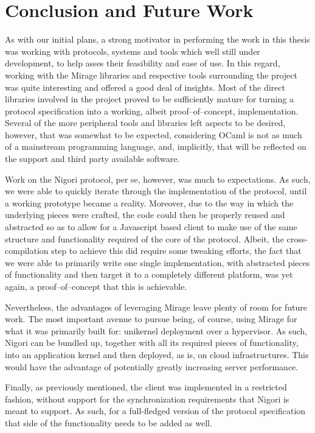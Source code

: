 \chapter{Conclusion and Future Work} \label{chapter:conclusion}
As with our initial plans, a strong motivator in performing the work in this thesis was working with protocols, systems and tools which well still under development, to help asses their feasibility and ease of use.
In this regard, working with the Mirage libraries and respective tools surrounding the project was quite interesting and offered a good deal of insights.
Most of the direct libraries involved in the project proved to be sufficiently mature for turning a protocol specification into a working, albeit proof--of--concept, implementation.
Several of the more peripheral tools and libraries left aspects to be desired, however, that was somewhat to be expected, considering OCaml is not as much of a mainstream programming language, and, implicitly, that will be reflected on the support and third party available software.

Work on the Nigori protocol, per se, however, was much to expectations.
As such, we were able to quickly iterate through the implementation of the protocol, until a working prototype became a reality.
Moreover, due to the way in which the underlying pieces were crafted, the code could then be properly reused and abstracted so as to allow for a Javascript based client to make use of the same structure and functionality required of the core of the protocol.
Albeit, the cross-compilation step to achieve this did require some tweaking efforts, the fact that we were able to primarily write one single implementation, with abstracted pieces of functionality and then target it to a completely different platform, was yet again, a proof--of--concept that this is achievable.

Nevertheless, the advantages of leveraging Mirage leave plenty of room for future work.
The most important avenue to pursue being, of course, using Mirage for what it was primarily built for: unikernel deployment over a hypervisor.
As such, Nigori can be bundled up, together with all its required pieces of functionality, into an application kernel and then deployed, as is, on cloud infrastructures.
This would have the advantage of potentially greatly increasing server performance.

Finally, as previously mentioned, the client was implemented in a restricted fashion, without support for the synchronization requirements that Nigori is meant to support.
As such, for a full-fledged version of the protocol specification that side of the functionality needs to be added as well.

